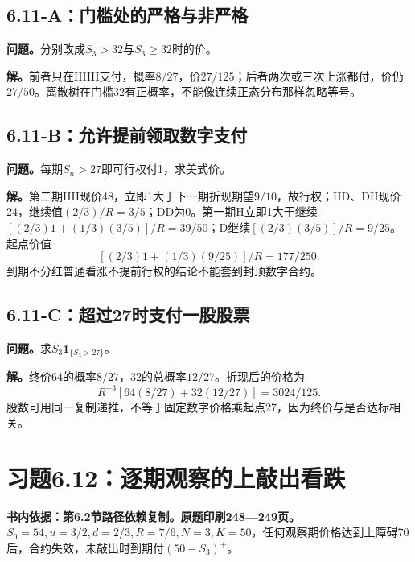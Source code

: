 \documentclass[11pt,a4paper,UTF8,fontset=fandol]{ctexart}
\begin{document}
\endgroup

\subsection{6.11-A：门槛处的严格与非严格}\label{aux95e8ux69dbux5904ux7684ux4e25ux683cux4e0eux975eux4e25ux683c}

\textbf{问题。}分别改成\(S_3>32\)与\(S_3\ge32\)时的价。

\textbf{解。}前者只在HHH支付，概率\(8/27\)，价\(\boxed{27/125}\)；后者两次或三次上涨都付，价仍\(\boxed{27/50}\)。离散树在门槛32有正概率，不能像连续正态分布那样忽略等号。

\subsection{6.11-B：允许提前领取数字支付}\label{bux5141ux8bb8ux63d0ux524dux9886ux53d6ux6570ux5b57ux652fux4ed8}

\textbf{问题。}每期\(S_n>27\)即可行权付1，求美式价。

\textbf{解。}第二期HH现价48，立即1大于下一期折现期望\(9/10\)，故行权；HD、DH现价24，继续值\((2/3)/R=3/5\)；DD为0。第一期H立即1大于继续\([(2/3)1+(1/3)(3/5)]/R=39/50\)；D继续\([(2/3)(3/5)]/R=9/25\)。起点价值
\[\boxed{[(2/3)1+(1/3)(9/25)]/R=177/250.}\]
到期不分红普通看涨不提前行权的结论不能套到封顶数字合约。

\subsection{6.11-C：超过27时支付一股股票}\label{cux8d85ux8fc727ux65f6ux652fux4ed8ux4e00ux80a1ux80a1ux7968}

\textbf{问题。}求\(S_3\mathbf1_{\{S_3>27\}}\)。

\textbf{解。}终价64的概率\(8/27\)，32的总概率\(12/27\)。折现后的价格为
\[\boxed{R^{-3}[64(8/27)+32(12/27)]=3024/125.}\]
股数可用同一复制递推，不等于固定数字价格乘起点27，因为终价与是否达标相关。

\bigskip

\section{习题6.12：逐期观察的上敲出看跌}\label{ux4e60ux98986.12ux9010ux671fux89c2ux5bdfux7684ux4e0aux6572ux51faux770bux8dcc}

\textbf{书内依据：第6.2节路径依赖复制。原题印刷248---249页。}\(S_0=54,u=3/2,d=2/3,R=7/6,N=3,K=50\)，任何观察期价格达到上障碍70后，合约失效，未敲出时到期付\((50-S_3)^+\)。
\end{document}
